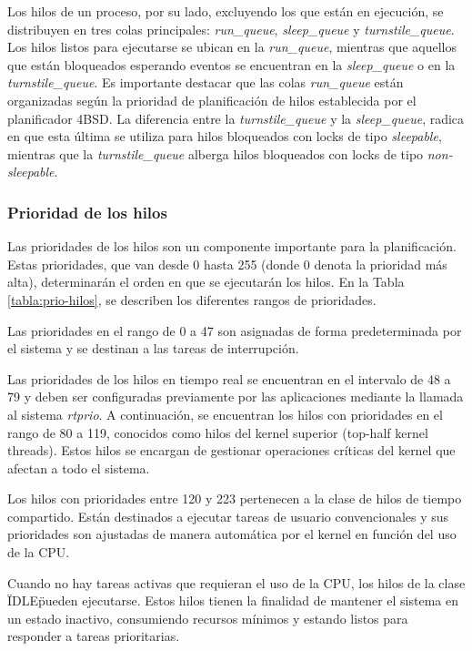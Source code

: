 Los hilos de un proceso, por su lado, excluyendo los que están en ejecución, se distribuyen en tres colas principales: \textit{run\_queue}, \textit{sleep\_queue} y \textit{turnstile\_queue}. Los hilos listos para ejecutarse se ubican en la \textit{run\_queue}, mientras que aquellos que están bloqueados esperando eventos se encuentran en la \textit{sleep\_queue} o en la \textit{turnstile\_queue}. Es importante destacar que las colas \textit{run\_queue} están organizadas según la prioridad de planificación de hilos establecida por el planificador 4BSD. La diferencia entre la \textit{turnstile\_queue} y la \textit{sleep\_queue}, radica en que esta última se utiliza para hilos bloqueados con locks de tipo \textit{sleepable}, mientras que la \textit{turnstile\_queue} alberga hilos bloqueados con locks de tipo \textit{non-sleepable}.

\subsubsection{Prioridad de los hilos}

Las prioridades de los hilos son un componente importante para la planificación. Estas prioridades, que van desde 0 hasta 255 (donde 0 denota la prioridad más alta), determinarán el orden en que se ejecutarán los hilos. En la Tabla \ref{tabla:prio-hilos}, se describen los diferentes rangos de prioridades.

Las prioridades en el rango de 0 a 47 son asignadas de forma predeterminada por el sistema y se destinan a las tareas de interrupción.\par

Las prioridades de los hilos en tiempo real se encuentran en el intervalo de 48 a 79 y deben ser configuradas previamente por las aplicaciones mediante la llamada al sistema \textit{rtprio}. A continuación, se encuentran los hilos con prioridades en el rango de 80 a 119, conocidos como hilos del kernel superior (top-half kernel threads). Estos hilos se encargan de gestionar operaciones críticas del kernel que afectan a todo el sistema.\par

Los hilos con prioridades entre 120 y 223 pertenecen a la clase de hilos de tiempo compartido. Están destinados a ejecutar tareas de usuario convencionales y sus prioridades son ajustadas de manera automática por el kernel en función del uso de la CPU.\par

Cuando no hay tareas activas que requieran el uso de la CPU, los hilos de la clase \"IDLE\" pueden ejecutarse. Estos hilos tienen la finalidad de mantener el sistema en un estado inactivo, consumiendo recursos mínimos y estando listos para responder a tareas prioritarias.\par

